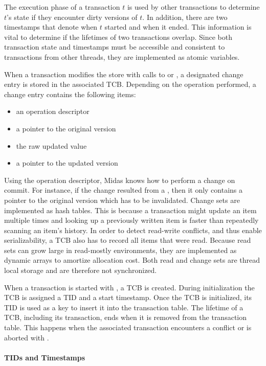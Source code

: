 The execution phase of a transaction $t$ is used by other transactions to determine $t$'s state if they encounter dirty versions of $t$. In addition, there are two timestamps that denote when $t$ started and when it ended. This information is vital to determine if the lifetimes of two transactions overlap. Since both transaction state and timestamps must be accessible and consistent to transactions from other threads, they are implemented as atomic variables.

When a transaction modifies the store with calls to  or , a designated change entry is stored in the associated TCB. Depending on the operation performed, a change entry contains the following items:

\begin{itemize}
    \item an operation descriptor
    \item a pointer to the original version
    \item the raw updated value
    \item a pointer to the updated version
\end{itemize}

Using the operation descriptor, Midas knows how to perform a change on commit. For instance, if the change resulted from a , then it only contains a pointer to the original version which has to be invalidated. Change sets are implemented as hash tables. This is because a transaction might update an item multiple times and looking up a previously written item is faster than repeatedly scanning an item's history. In order to detect read-write conflicts, and thus enable serializability, a TCB also has to record all items that were read. Because read sets can grow large in read-mostly environments, they are implemented as dynamic arrays to amortize allocation cost. Both read and change sets are thread local storage and are therefore not synchronized.

When a transaction is started with , a TCB is created. During initialization the TCB is assigned a TID and a start timestamp.  Once the TCB is initialized, its TID is used as a key to insert it into the transaction table. The lifetime of a TCB, including its transaction, ends when it is removed from the transaction table. This happens when the associated transaction encounters a conflict or is aborted with .

\paragraph{TIDs and Timestamps}

